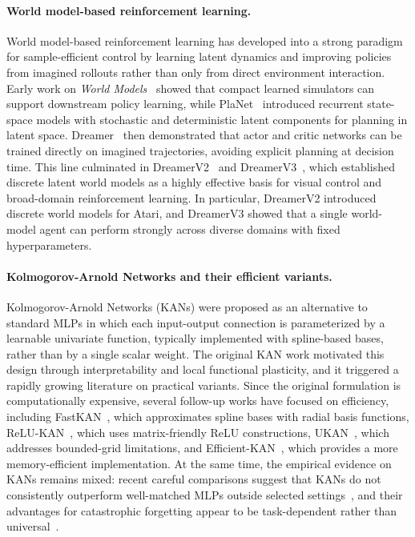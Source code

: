 \documentclass[11pt, a4paper]{article}
\begin{document}
\paragraph{World model-based reinforcement learning.}
World model-based reinforcement learning has developed into a strong paradigm
for sample-efficient control by learning latent dynamics and improving policies
from imagined rollouts rather than only from direct environment interaction.
Early work on \emph{World Models}~\cite{ha2018world} showed that compact learned simulators can
support downstream policy learning, while PlaNet~\cite{hafner2019planet} introduced recurrent
state-space models with stochastic and deterministic latent components for
planning in latent space. Dreamer~\cite{hafner2019dreamer} then demonstrated that actor and critic
networks can be trained directly on imagined trajectories, avoiding explicit
planning at decision time. This line culminated in DreamerV2~\cite{hafner2021dreamerv2} and
DreamerV3~\cite{hafner2023dreamerv3}, which established discrete latent world models as a highly
effective basis for visual control and broad-domain reinforcement learning. In
particular, DreamerV2 introduced discrete world models for Atari, and DreamerV3
showed that a single world-model agent can perform strongly across diverse
domains with fixed hyperparameters. 

\paragraph{Kolmogorov-Arnold Networks and their efficient variants.}
Kolmogorov-Arnold Networks (KANs) were proposed as an alternative to standard
MLPs in which each input-output connection is parameterized by a learnable
univariate function, typically implemented with spline-based bases, rather than
by a single scalar weight. The original KAN work motivated this design through
interpretability and local functional plasticity, and it triggered a rapidly
growing literature on practical variants. Since the original formulation is
computationally expensive, several follow-up works have focused on efficiency,
including FastKAN~\cite{li2024fastkan}, which approximates spline bases with radial basis
functions, ReLU-KAN~\cite{qiu2024relukan}, which uses matrix-friendly ReLU constructions,
UKAN~\cite{ukan2024}, which addresses bounded-grid limitations, and Efficient-KAN~\cite{blealtan2024},
which provides a more memory-efficient implementation. At the same time, the
empirical evidence on KANs remains mixed: recent careful comparisons suggest
that KANs do not consistently outperform well-matched MLPs outside selected
settings~\cite{kanvmlp2024}, and their advantages for catastrophic forgetting
appear to be task-dependent rather than universal~\cite{kanforgetting2024}. 
\end{document}
